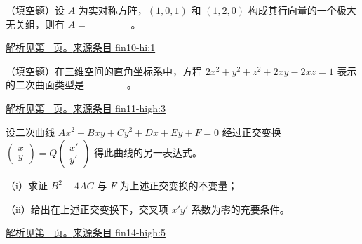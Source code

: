 \documentclass[UTF8,12pt,a4paper,fontset=fandol]{ctexart}
\begin{document}
\begin{example}\label{ex:fin10-hi:1}

（填空题）设 $A$ 为实对称方阵，$(1,0,1)$ 和 $(1,2,0)$ 构成其行向量的一个极大无关组，则有 $A = $ $\underline{\qquad\qquad}$。

\par\hyperref[ans:fin10-hi:1]{解析见第~\pageref{ans:fin10-hi:1} 页。}\quad\href{https://github.com/lzxcr/cmc-mathematics/blob/64916fa1fdbc3e444a652eca204d5669058ee321/src/problems/finals/10/01.md}{来源条目 fin10-hi:1}

\end{example}

\begin{example}\label{ex:fin11-high:3}

（填空题）在三维空间的直角坐标系中，方程 $2x^{2}+y^{2}+z^{2}+2xy-2xz=1$ 表示的二次曲面类型是 $\underline{\qquad\qquad}$。

\par\hyperref[ans:fin11-high:3]{解析见第~\pageref{ans:fin11-high:3} 页。}\quad\href{https://github.com/lzxcr/cmc-mathematics/blob/64916fa1fdbc3e444a652eca204d5669058ee321/src/problems/finals/11/03.md}{来源条目 fin11-high:3}

\end{example}

\begin{example}\label{ex:fin14-high:5}

设二次曲线 $Ax^2+Bxy+Cy^2+Dx+Ey+F=0$ 经过正交变换 $\begin{pmatrix} x \\ y \end{pmatrix}=Q \begin{pmatrix} x' \\ y' \end{pmatrix}$ 得此曲线的另一表达式。

（i）求证 $B^2-4AC$ 与 $F$ 为上述正交变换的不变量；

（ii）给出在上述正交变换下，交叉项 $x'y'$ 系数为零的充要条件。

\par\hyperref[ans:fin14-high:5]{解析见第~\pageref{ans:fin14-high:5} 页。}\quad\href{https://github.com/lzxcr/cmc-mathematics/blob/64916fa1fdbc3e444a652eca204d5669058ee321/src/problems/finals/14/05.md}{来源条目 fin14-high:5}

\end{example}
\end{document}
